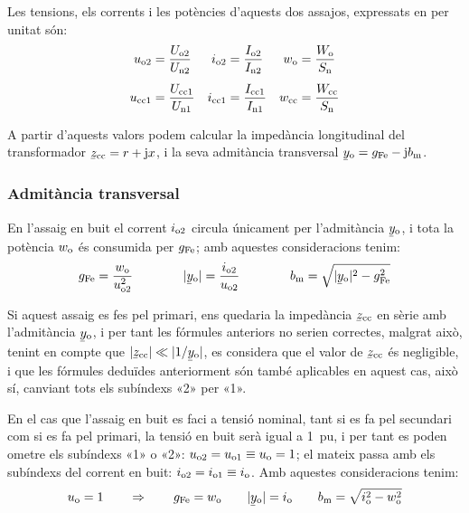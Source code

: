 Les tensions, els corrents i les potències d'aquests dos  assajos,
expressats en per unitat són:
\begin{align}
    u_\mathrm{o2} &=\frac{U_\mathrm{o2}}{U_\mathrm{n2}} &
    i_\mathrm{o2} &=\frac{I_\mathrm{o2}}{I_\mathrm{n2}} &
    w_\mathrm{o}  &=\frac{W_\mathrm{o}}{S_\mathrm{n}} \\[1ex]
    u_\mathrm{cc1} &=\frac{U_\mathrm{cc1}}{U_\mathrm{n1}} &
    i_\mathrm{cc1} &=\frac{I_\mathrm{cc1}}{I_\mathrm{n1}} &
    w_\mathrm{cc} &=\frac{W_\mathrm{cc}}{S_\mathrm{n}}
\end{align}

A partir d'aquests valors podem calcular la impedància longitudinal
del transformador $\cmplx{z}\ped{cc}=r+\ju x$, i la seva admitància
transversal $\cmplx{y}\ped{o}=g\ped{Fe}-\ju b\ped{m}$.

\subsubsection{Admitància transversal}

En l'assaig en buit el corrent $i_\mathrm{o2}$ circula
únicament per l'admitància $\cmplx{y}\ped{o}$, i tota la potència
$w_\mathrm{o}$ és consumida per $g_\mathrm{Fe}$; amb aquestes consideracions
tenim:
\begin{equation}
    g\ped{Fe} = \frac{w\ped{o}}{u\ped{o2}^2} \qquad\qquad
    |\cmplx{y}\ped{o}| = \frac{i\ped{o2}}{u\ped{o2}}
    \qquad\qquad
    b\ped{m} = \sqrt{|\cmplx{y}\ped{o}|^2 - g\ped{Fe}^2}
\end{equation}

Si aquest assaig es fes pel primari, ens quedaria la impedància
$\cmplx{z}\ped{cc}$ en sèrie amb l'admitància $\cmplx{y}\ped{o}$, i
per tant les fórmules anteriors no serien correctes, malgrat això,
tenint en compte que $|\cmplx{z}\ped{cc}| \ll |1/\cmplx{y}\ped{o}|$,
es  considera que el valor de $\cmplx{z}\ped{cc}$ és negligible, i
que les fórmules deduïdes anteriorment són també aplicables en
aquest cas, això sí, canviant tots els subíndexs «2» per «1».

En el cas que l'assaig en buit es faci a tensió nominal, tant  si es
fa pel secundari com si es fa pel primari, la tensió en buit serà
igual a \qty{1}{pu}, i per tant es poden ometre els subíndexs «1» o «2»:
$u_\mathrm{o2} = u_\mathrm{o1} \equiv u_\mathrm{o} = 1$; el mateix passa amb els
subíndexs del corrent en buit: $i_\mathrm{o2} = i_\mathrm{o1} \equiv
i_\mathrm{o}$. Amb aquestes consideracions tenim:
\begin{equation}
    u\ped{o} = 1 \qquad \Rightarrow \qquad g\ped{Fe} = w\ped{o} \qquad
    |\cmplx{y}\ped{o}| = i\ped{o} \qquad
    b\ped{m} = \sqrt{i\ped{o}^2 - w\ped{o}^2}
    \label{eq:assaig-buit-nomianl}
\end{equation}

